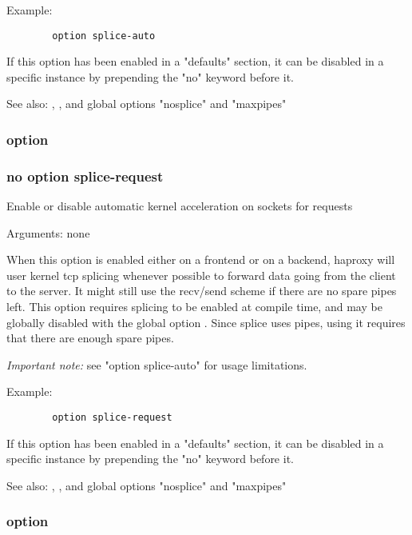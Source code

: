 {  Example:
  \begin{verbatim}
        option splice-auto
  \end{verbatim}

  If this option has been enabled in a "defaults" section, it can be disabled
  in a specific instance by prepending the "no" keyword before it.

  See also: , , and global
             options "nosplice" and "maxpipes"

\subsubsection[splice-request]{option }
\subsubsection*{no option splice-request}


  Enable or disable automatic kernel acceleration on sockets for requests


  Arguments: none

  When this option is enabled either on a frontend or on a backend, haproxy
  will user kernel tcp splicing whenever possible to forward data going from
  the client to the server. It might still use the recv/send scheme if there
  are no spare pipes left. This option requires splicing to be enabled at
  compile time, and may be globally disabled with the global option .
  Since splice uses pipes, using it requires that there are enough spare pipes.

  \emph{Important note:} see "option splice-auto" for usage limitations.

  Example:
  \begin{verbatim}
        option splice-request
  \end{verbatim}
  
  If this option has been enabled in a "defaults" section, it can be disabled
  in a specific instance by prepending the "no" keyword before it.

  See also: , , and global options
             "nosplice" and "maxpipes"

\subsubsection[splice-response]{option }
}
